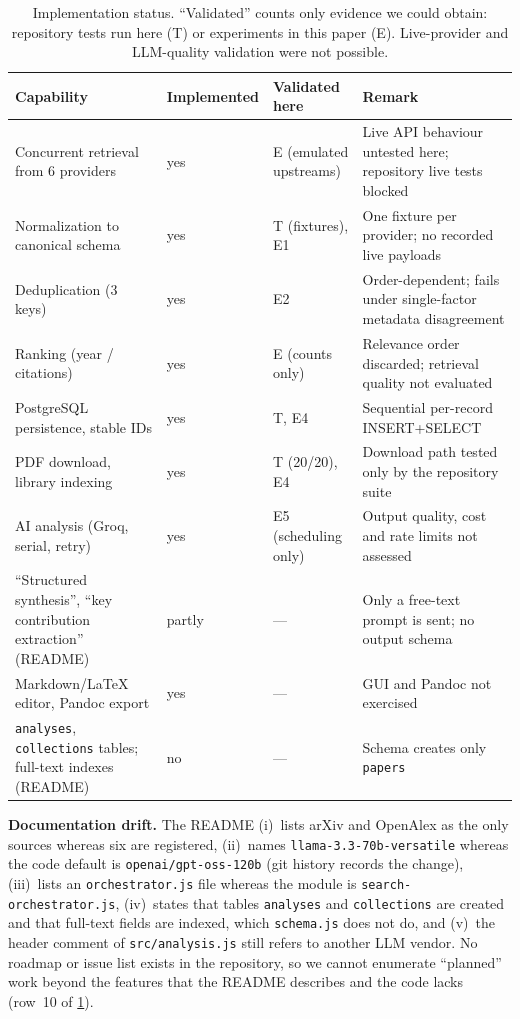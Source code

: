 \documentclass[conference]{IEEEtran}
\newcommand{\code}[1]{\texttt{\small #1}}
\begin{document}
\begin{table}[t]
\centering
\caption{Implementation status. ``Validated'' counts only evidence we could obtain: repository tests run here (T) or experiments in this paper (E). Live-provider and LLM-quality validation were not possible.}
\label{tab:status}
\footnotesize
\begin{tabular}{@{}p{4.2cm} p{1.6cm} p{4.3cm} p{5.7cm}@{}}
\toprule
Capability & Implemented & Validated here & Remark \\
\midrule
Concurrent retrieval from 6 providers & yes & E (emulated upstreams) & Live API behaviour untested here; repository live tests blocked \\
Normalization to canonical schema & yes & T (fixtures), E1 & One fixture per provider; no recorded live payloads \\
Deduplication (3 keys) & yes & E2 & Order-dependent; fails under single-factor metadata disagreement \\
Ranking (year / citations) & yes & E (counts only) & Relevance order discarded; retrieval quality not evaluated \\
PostgreSQL persistence, stable IDs & yes & T, E4 & Sequential per-record INSERT+SELECT \\
PDF download, library indexing & yes & T (20/20), E4 & Download path tested only by the repository suite \\
AI analysis (Groq, serial, retry) & yes & E5 (scheduling only) & Output quality, cost and rate limits not assessed \\
``Structured synthesis'', ``key contribution extraction'' (README) & partly & --- & Only a free-text prompt is sent; no output schema \\
Markdown/\LaTeX{} editor, Pandoc export & yes & --- & GUI and Pandoc not exercised \\
\texttt{analyses}, \texttt{collections} tables; full-text indexes (README) & no & --- & Schema creates only \code{papers} \\
\bottomrule
\end{tabular}
\end{table}

\textbf{Documentation drift.} The README (i)~lists arXiv and OpenAlex as the only sources whereas six are registered, (ii)~names \code{llama-3.3-70b-versatile} whereas the code default is \code{openai/gpt-oss-120b} (git history records the change), (iii)~lists an \code{orchestrator.js} file whereas the module is \code{search-orchestrator.js}, (iv)~states that tables \code{analyses} and \code{collections} are created and that full-text fields are indexed, which \code{schema.js} does not do, and (v)~the header comment of \code{src/analysis.js} still refers to another LLM vendor. No roadmap or issue list exists in the repository, so we cannot enumerate ``planned'' work beyond the features that the README describes and the code lacks (row~10 of \cref{tab:status}).
\end{document}
